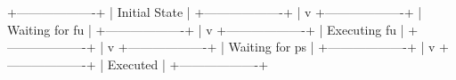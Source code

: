 +-------------------+
|  Initial State    |
+-------------------+
         |
         v
+-------------------+
|  Waiting for fu   |
+-------------------+
         |
         v
+-------------------+
|  Executing fu     |
+-------------------+
         |
         v
+-------------------+
|  Waiting for ps   |
+-------------------+
         |
         v
+-------------------+
|  Executed        |
+-------------------+